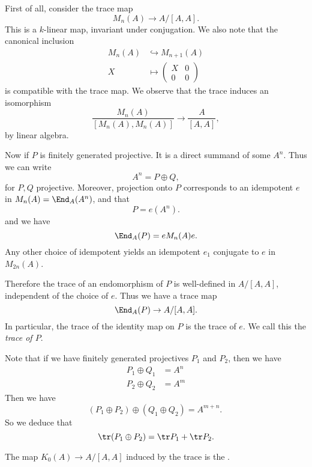 \documentclass[a4paper]{article}
\begin{document}
First of all, consider the trace map
\[
  M_n(A) \to A/[A, A].
\]
This is a $k$-linear map, invariant under conjugation. We also note that the canonical inclusion
\begin{align*}
  M_n(A) &\hookrightarrow M_{n + 1}(A)\\
  X & \mapsto
  \begin{pmatrix}
    X & 0\\
    0 & 0
  \end{pmatrix}
\end{align*}
is compatible with the trace map. We observe that the trace induces an isomorphism
\[
  \frac{M_n(A)}{[M_n(A), M_n(A)]} \to \frac{A}{[A, A]},
\]
by linear algebra.

Now if $P$ is finitely generated projective. It is a direct summand of some $A^n$. Thus we can write
\[
  A^n = P \oplus Q,
\]
for $P, Q$ projective. Moreover, projection onto $P$ corresponds to an idempotent $e$ in $M_n(A) = \End_A(A^n)$, and that
\[
  P = e(A^n).
\]
and we have
\[
  \End_A(P) = e M_n(A) e.
\]
Any other choice of idempotent yields an idempotent $e_1$ conjugate to $e$ in $M_{2n}(A)$. %

Therefore the trace of an endomorphism of $P$ is well-defined in $A/[A, A]$, independent of the choice of $e$. Thus we have a trace map
\[
  \End_A(P) \to A/[A, A].
\]
In particular, the trace of the identity map on $P$ is the trace of $e$. We call this the \emph{trace of $P$}.

Note that if we have finitely generated projectives $P_1$ and $P_2$, then we have
\begin{align*}
  P_1 \oplus Q_1 &= A^n\\
  P_2 \oplus Q_2 &= A^m
\end{align*}
Then we have
\[
  (P_1 \oplus P_2) \oplus (Q_1 \oplus Q_2) = A^{m + n}.\
\]
So we deduce that
\[
  \tr (P_1 \oplus P_2) = \tr P_1 + \tr P_2.
\]
\begin{defi}
  The map $K_0(A) \to A/[A, A]$ induced by the trace is the .
\end{defi}
\end{document}

